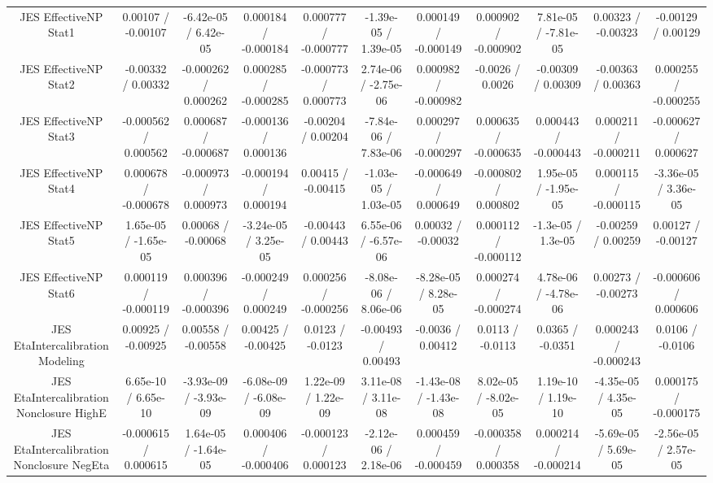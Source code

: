 \begin{table}[htbp]
\begin{center}
\begin{tabular}{|c|c|c|c|c|c|c|c|c|c|c|}
  JES EffectiveNP Stat1 & 0.00107 / -0.00107 & -6.42e-05 / 6.42e-05 & 0.000184 / -0.000184 & 0.000777 / -0.000777 & -1.39e-05 / 1.39e-05 & 0.000149 / -0.000149 & 0.000902 / -0.000902 & 7.81e-05 / -7.81e-05 & 0.00323 / -0.00323 & -0.00129 / 0.00129 \\ 
  JES EffectiveNP Stat2 & -0.00332 / 0.00332 & -0.000262 / 0.000262 & 0.000285 / -0.000285 & -0.000773 / 0.000773 & 2.74e-06 / -2.75e-06 & 0.000982 / -0.000982 & -0.0026 / 0.0026 & -0.00309 / 0.00309 & -0.00363 / 0.00363 & 0.000255 / -0.000255 \\ 
  JES EffectiveNP Stat3 & -0.000562 / 0.000562 & 0.000687 / -0.000687 & -0.000136 / 0.000136 & -0.00204 / 0.00204 & -7.84e-06 / 7.83e-06 & 0.000297 / -0.000297 & 0.000635 / -0.000635 & 0.000443 / -0.000443 & 0.000211 / -0.000211 & -0.000627 / 0.000627 \\ 
  JES EffectiveNP Stat4 & 0.000678 / -0.000678 & -0.000973 / 0.000973 & -0.000194 / 0.000194 & 0.00415 / -0.00415 & -1.03e-05 / 1.03e-05 & -0.000649 / 0.000649 & -0.000802 / 0.000802 & 1.95e-05 / -1.95e-05 & 0.000115 / -0.000115 & -3.36e-05 / 3.36e-05 \\ 
  JES EffectiveNP Stat5 & 1.65e-05 / -1.65e-05 & 0.00068 / -0.00068 & -3.24e-05 / 3.25e-05 & -0.00443 / 0.00443 & 6.55e-06 / -6.57e-06 & 0.00032 / -0.00032 & 0.000112 / -0.000112 & -1.3e-05 / 1.3e-05 & -0.00259 / 0.00259 & 0.00127 / -0.00127 \\ 
  JES EffectiveNP Stat6 & 0.000119 / -0.000119 & 0.000396 / -0.000396 & -0.000249 / 0.000249 & 0.000256 / -0.000256 & -8.08e-06 / 8.06e-06 & -8.28e-05 / 8.28e-05 & 0.000274 / -0.000274 & 4.78e-06 / -4.78e-06 & 0.00273 / -0.00273 & -0.000606 / 0.000606 \\ 
  JES EtaIntercalibration Modeling & 0.00925 / -0.00925 & 0.00558 / -0.00558 & 0.00425 / -0.00425 & 0.0123 / -0.0123 & -0.00493 / 0.00493 & -0.0036 / 0.00412 & 0.0113 / -0.0113 & 0.0365 / -0.0351 & 0.000243 / -0.000243 & 0.0106 / -0.0106 \\ 
  JES EtaIntercalibration Nonclosure HighE & 6.65e-10 / 6.65e-10 & -3.93e-09 / -3.93e-09 & -6.08e-09 / -6.08e-09 & 1.22e-09 / 1.22e-09 & 3.11e-08 / 3.11e-08 & -1.43e-08 / -1.43e-08 & 8.02e-05 / -8.02e-05 & 1.19e-10 / 1.19e-10 & -4.35e-05 / 4.35e-05 & 0.000175 / -0.000175 \\ 
  JES EtaIntercalibration Nonclosure NegEta & -0.000615 / 0.000615 & 1.64e-05 / -1.64e-05 & 0.000406 / -0.000406 & -0.000123 / 0.000123 & -2.12e-06 / 2.18e-06 & 0.000459 / -0.000459 & -0.000358 / 0.000358 & 0.000214 / -0.000214 & -5.69e-05 / 5.69e-05 & -2.56e-05 / 2.57e-05 \\ 

\end{tabular}
\end{center}
\end{table}
